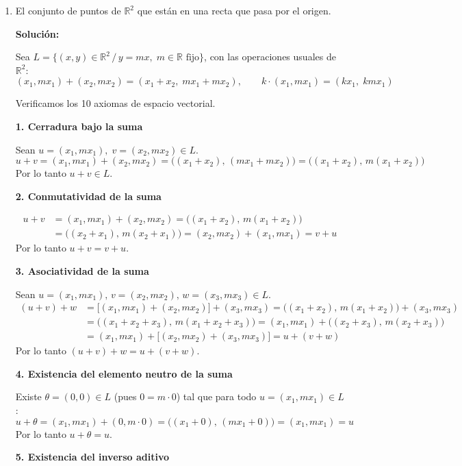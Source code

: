 \documentclass[12pt]{article}
\newcommand{\solucion}{%
    \vspace{0.8em}%
    \textbf{Solución:}%
    \vspace{0.8em}%
}
\begin{document}
\begin{enumerate}[label=\alph*.-]
    \item El conjunto de puntos de $\mathbb{R}^2$ que están en una recta que pasa por el origen.

    \solucion

    Sea $L = \{(x,y) \in \mathbb{R}^2 \, / \, y = mx, \; m \in \mathbb{R} \text{ fijo}\}$, con las operaciones usuales de $\mathbb{R}^2$:
    \[
    (x_1,mx_1)+(x_2,mx_2) = (x_1+x_2,\; mx_1+mx_2), \qquad
    k\cdot(x_1,mx_1) = (kx_1,\; kmx_1)
    \]

    Verificamos los 10 axiomas de espacio vectorial.

    \textbf{1. Cerradura bajo la suma}

    Sean $u=(x_1,mx_1),\; v=(x_2,mx_2) \in L$.
    \[
    u+v = (x_1,mx_1)+(x_2,mx_2) = \big((x_1+x_2),\, (mx_1+mx_2)\big) = \big((x_1+x_2),\, m(x_1+x_2)\big)
    \]
    Por lo tanto $u+v \in L$.

    \textbf{2. Conmutatividad de la suma}

    \begin{align*}
    u+v &= (x_1,mx_1)+(x_2,mx_2) = \big((x_1+x_2),\, m(x_1+x_2)\big) \\
        &= \big((x_2+x_1),\, m(x_2+x_1)\big) = (x_2,mx_2)+(x_1,mx_1) = v+u
    \end{align*}
    Por lo tanto $u+v=v+u$.

    \textbf{3. Asociatividad de la suma}

    Sean $u=(x_1,mx_1),\, v=(x_2,mx_2),\, w=(x_3,mx_3) \in L$.
    \begin{align*}
    (u+v)+w &= \big[(x_1,mx_1)+(x_2,mx_2)\big]+(x_3,mx_3) = \big((x_1+x_2),\,m(x_1+x_2)\big)+(x_3,mx_3)\\
    &= \big((x_1+x_2+x_3),\, m(x_1+x_2+x_3)\big) = (x_1,mx_1)+\big((x_2+x_3),\,m(x_2+x_3)\big)\\
    &= (x_1,mx_1)+\big[(x_2,mx_2)+(x_3,mx_3)\big] = u+(v+w)
    \end{align*}
    Por lo tanto $(u+v)+w = u+(v+w)$.

    \textbf{4. Existencia del elemento neutro de la suma}

    Existe $\theta=(0,0) \in L$ (pues $0=m\cdot 0$) tal que para todo $u=(x_1,mx_1)\in L$:
    \[
    u+\theta = (x_1,mx_1)+(0,m\cdot 0) = \big((x_1+0),\,(mx_1+0)\big) = (x_1,mx_1) = u
    \]
    Por lo tanto $u+\theta = u$.

    \textbf{5. Existencia del inverso aditivo}


\end{enumerate}
\end{document}
